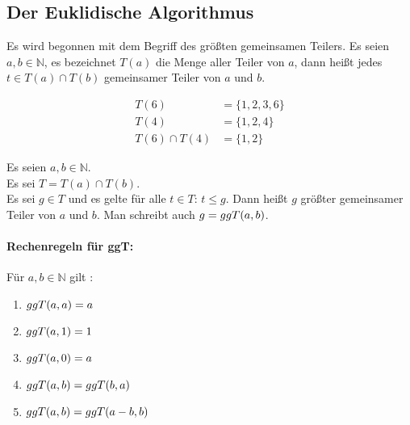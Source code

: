 \subsection{Der Euklidische Algorithmus}
Es wird begonnen mit dem Begriff des größten gemeinsamen Teilers.
Es seien $a,b \in  \mathbb{N}$, es bezeichnet $T(a)$ die Menge aller Teiler von $a$,
dann heißt jedes $t \in T(a) \cap T(b)$ gemeinsamer Teiler von $a$ und $b$.

\begin{example}
  \begin{align*}
    T(6)           & = \{1,2,3,6\} \\
    T(4)           & = \{1,2,4\}   \\
    T(6) \cap T(4) & = \{1,2\}
  \end{align*}
\end{example}

\begin{definition}
  Es seien $a,b \in \mathbb{N}$.\\
  Es sei $T = T(a) \cap T(b)$.\\
  Es sei $g \in T$ und es gelte für alle $t \in T$: $t \leq g$. Dann heißt $g$
  größter gemeinsamer Teiler von $a$ und $b$.
  Man schreibt auch $g = ggT(a,b)$.
\end{definition}

\paragraph{Rechenregeln für ggT:}
Für $a,b \in \mathbb{N}$ gilt \parencite{SITE:euklid}:
\begin{enumerate}[ref=(\arabic*)]
  \item $ggT(a,a) = a$ \label{enum:ggT1}
  \item $ggT(a,1) = 1$ \label{enum:ggT2}
  \item $ggT(a,0) = a$ \label{enum:ggT3}
  \item $ggT(a,b) = ggT(b,a)$ \label{enum:ggT4}
  \item $ggT(a,b) = ggT(a - b,b)$ \label{enum:ggT5}
\end{enumerate}

